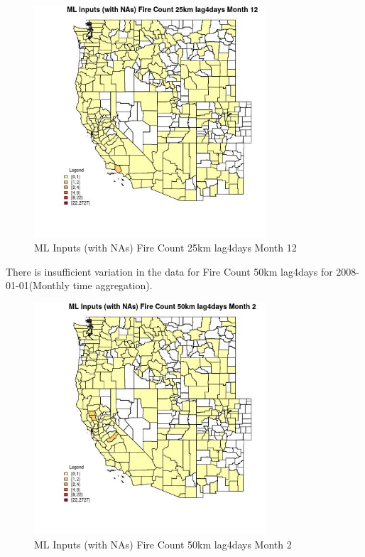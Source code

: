 \begin{figure} 
\centering  
\includegraphics[width=0.77\textwidth]{Code_Outputs/Report_ML_input_PM25_Step4_part_f_de_duplicated_aves_prioritize_24hr_obswNAs_CountyFire_Count_25km_lag4daysmedianMonth12.jpg} 
\caption{\label{fig:Report_ML_input_PM25_Step4_part_f_de_duplicated_aves_prioritize_24hr_obswNAsCountyFire_Count_25km_lag4daysmedianMonth12}ML Inputs (with NAs) Fire Count 25km lag4days Month 12} 
\end{figure} 
 

There is insufficient variation in the data for Fire Count 50km lag4days for 2008-01-01(Monthly time aggregation). 
 

\begin{figure} 
\centering  
\includegraphics[width=0.77\textwidth]{Code_Outputs/Report_ML_input_PM25_Step4_part_f_de_duplicated_aves_prioritize_24hr_obswNAs_CountyFire_Count_50km_lag4daysmedianMonth2.jpg} 
\caption{\label{fig:Report_ML_input_PM25_Step4_part_f_de_duplicated_aves_prioritize_24hr_obswNAsCountyFire_Count_50km_lag4daysmedianMonth2}ML Inputs (with NAs) Fire Count 50km lag4days Month 2} 
\end{figure} 
 

